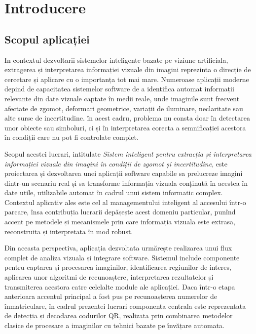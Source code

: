 \chapter{Introducere}

\section{Scopul aplicației}

In contextul dezvoltarii sistemelor inteligente bazate pe viziune artificiala, extragerea și interpretarea informației vizuale din imagini reprezinta o direcție de cercetare și aplicare cu o importanța tot mai mare. Numeroase aplicații moderne depind de capacitatea sistemelor software de a identifica automat informații relevante din date vizuale captate în medii reale, unde imaginile sunt frecvent afectate de zgomot, deformari geometrice, variații de iluminare, neclaritate sau alte surse de incertitudine. în acest cadru, problema nu consta doar în detectarea unor obiecte sau simboluri, ci și în interpretarea corecta a semnificației acestora în condiții care nu pot fi controlate complet.

Scopul acestei lucrari, intitulate \textit{Sistem inteligent pentru extracția și interpretarea informației vizuale din imagini în condiții de zgomot și incertitudine}, este proiectarea și dezvoltarea unei aplicații software capabile sa prelucreze imagini dintr-un scenariu real și sa transforme informația vizuala conținută în acestea în date utile, utilizabile automat în cadrul unui sistem informatic complex. Contextul aplicativ ales este cel al managementului inteligent al accesului într-o parcare, însa contribuția lucrarii depășește acest domeniu particular, punînd accent pe metodele și mecanismele prin care informația vizuala este extrasa, reconstruita și interpretata în mod robust.

Din aceasta perspectiva, aplicația dezvoltata urmărește realizarea unui flux complet de analiza vizuala și integrare software. Sistemul include componente pentru captarea și procesarea imaginilor, identificarea regiunilor de interes, aplicarea unor algoritmi de recunoaștere, interpretarea rezultatelor și transmiterea acestora catre celelalte module ale aplicației. Daca într-o etapa anterioara accentul principal a fost pus pe recunoașterea numerelor de înmatriculare, în cadrul prezentei lucrari componenta centrala este reprezentata de detecția și decodarea codurilor QR, realizata prin combinarea metodelor clasice de procesare a imaginilor cu tehnici bazate pe învățare automata.

